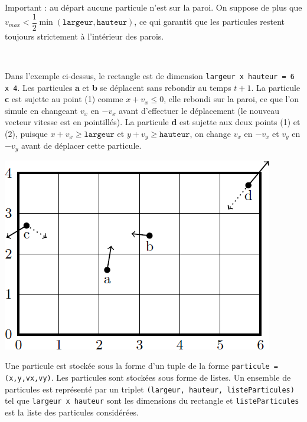 \documentclass[10pt,fleqn]{article} %
\begin{document}
\begin{rem}
Important : au départ aucune particule n'est sur la paroi. On suppose de plus que $v_{max}<\dfrac{1}{2}\min \left(\texttt{largeur},\texttt{hauteur}\right)$, ce qui garantit que les particules restent toujours strictement à l'intérieur des parois. 
\end{rem}

\begin{exemple}~\\

\begin{minipage}[c]{.6\linewidth}
Dans l'exemple ci-dessus, le rectangle est de dimension \texttt{largeur x hauteur = 6 x 4}. Les particules \textbf{a} et \textbf{b} se déplacent sans rebondir au temps $t+1$. La particule \textbf{c} est sujette au point (1) comme $x+v_x\leq 0$, elle rebondi sur la paroi, ce que l'on simule en changeant $v_x$ en $-v_x$ avant d'effectuer le déplacement (le nouveau vecteur vitesse est en pointillés). La particule \textbf{d} est sujette aux deux points (1) et (2), puisque $x+v_x \geq \texttt{largeur}$ et  $y+v_y \geq \texttt{hauteur}$, on change $v_x$ en $-v_x$ et  $v_y$ en $-v_y$ avant de déplacer cette particule. 
\end{minipage}
\begin{minipage}[c]{.35\linewidth}
\begin{center}
\includegraphics[width=.9\linewidth]{images/fig_01}
\end{center}
\end{minipage}
\end{exemple}

Une particule est stockée sous la forme d'un tuple de la forme \texttt{particule = (x,y,vx,vy)}.
Les particules sont stockées sous forme de listes. Un ensemble de particules est représenté par un triplet \texttt{(largeur, hauteur, listeParticules)} tel que \texttt{largeur x hauteur} sont les dimensions du rectangle et \texttt{listeParticules} est la liste des particules considérées. 
\end{document}
